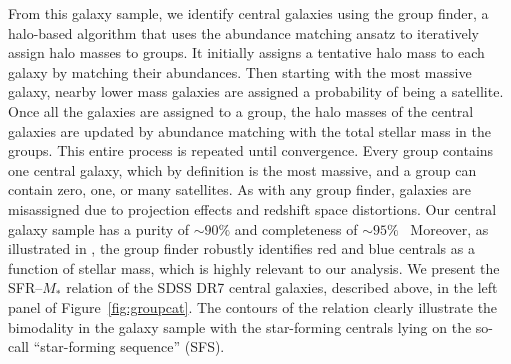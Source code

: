 \documentclass[12pt, letterpaper, preprint, tighten]{aastex62}
\begin{document}
From this galaxy sample, we identify central galaxies using the 
\cite{tinker2011} group finder, a halo-based algorithm that uses 
the abundance matching ansatz to iteratively assign halo masses to groups. 
It initially assigns a tentative halo mass to each galaxy by matching their 
abundances. Then starting with the most massive galaxy, nearby lower
mass galaxies are assigned a probability of being a satellite. Once all 
the galaxies are assigned to a group, the halo masses of the central galaxies 
are updated by abundance matching with the total stellar mass in the groups. 
This entire process is repeated until convergence. Every group contains one 
central galaxy, which by definition is the most massive, and a group can 
contain zero, one, or many satellites.
As with any group finder, galaxies are misassigned due to projection 
effects and redshift space distortions. Our central galaxy sample has
a purity of ${\sim}90\%$ and completeness of ${\sim}95\%$~\citep{tinker2018}
Moreover, as illustrated in \cite{campbell2015}, the \cite{tinker2011} group
finder robustly identifies red and blue centrals as a function of stellar mass, 
which is highly relevant to our analysis.  
We present the SFR--$M_*$ relation of the SDSS DR7 central galaxies, described 
above, in the left panel of Figure~\ref{fig:groupcat}. The contours of the 
relation clearly illustrate the bimodality in the galaxy sample with the 
star-forming centrals lying on the so-call ``star-forming sequence'' (SFS). 
\end{document}

